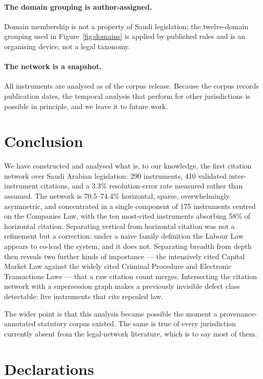 \documentclass[sn-basic]{sn-jnl}%
\begin{document}
\paragraph{The domain grouping is author-assigned.}
Domain membership is not a property of Saudi legislation; the twelve-domain
grouping used in Figure~\ref{fig:domains} is applied by published rules and
is an organising device, not a legal taxonomy.

\paragraph{The network is a snapshot.}
All instruments are analysed as of the corpus release. Because the corpus
records publication dates, the temporal analysis that
\citet{coupette2021measuring} perform for other jurisdictions is possible in
principle, and we leave it to future work.

\section{Conclusion}
\label{sec:conclusion}

We have constructed and analysed what is, to our knowledge, the first
citation network over Saudi
Arabian legislation: 290 instruments, 410 validated inter-instrument
citations, and a 3.3\% resolution-error rate measured rather than assumed.
The network is 70.5--74.4\% horizontal, sparse, overwhelmingly asymmetric,
and concentrated in a single component of 175 instruments centred on the
Companies Law, with the ten most-cited instruments absorbing 58\% of
horizontal citation. Separating vertical from horizontal citation was not a
refinement but a correction: under a naive family definition the Labour Law
appears to co-lead the system, and it does not. Separating breadth from
depth then reveals two further kinds of importance --- the intensively cited
Capital Market Law against the widely cited Criminal Procedure and
Electronic Transactions Laws --- that a raw citation count merges. Intersecting the citation network with
a supersession graph makes a previously invisible defect class detectable:
live instruments that cite repealed law.

The wider point is that this analysis became possible the moment a
provenance-annotated statutory corpus existed. The same is true of every
jurisdiction currently absent from the legal-network literature, which is to
say most of them.

\section*{Declarations}
\end{document}
